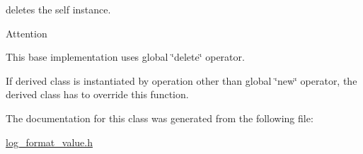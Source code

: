 deletes the self instance. 

\begin{DoxyAttention}{Attention}

\begin{DoxyItemize}
\item This base implementation uses global \char`\"{}delete\char`\"{} operator.
\item If derived class is instantiated by operation other than global \char`\"{}new\char`\"{} operator, the derived class has to override this function. 
\end{DoxyItemize}
\end{DoxyAttention}


The documentation for this class was generated from the following file\-:\begin{DoxyCompactItemize}
\item 
\hyperlink{log__format__value_8h}{log\-\_\-format\-\_\-value.\-h}\end{DoxyCompactItemize}
